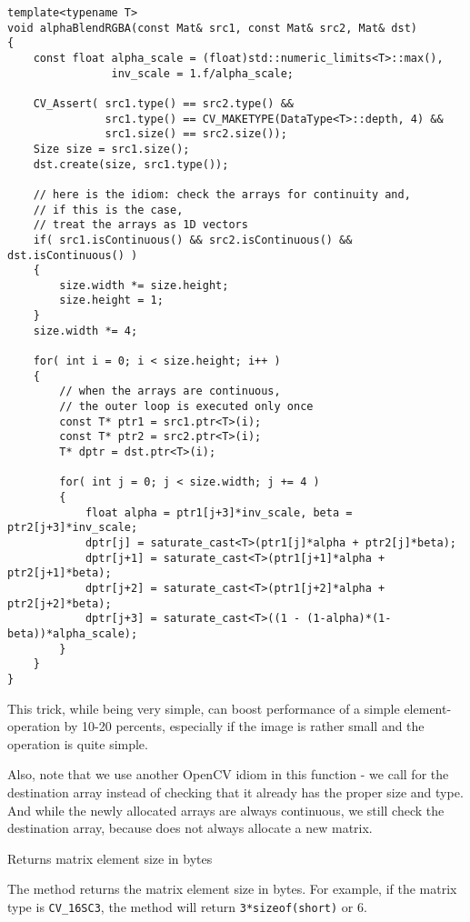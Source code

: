 \begin{lstlisting}
template<typename T>
void alphaBlendRGBA(const Mat& src1, const Mat& src2, Mat& dst)
{
    const float alpha_scale = (float)std::numeric_limits<T>::max(),
                inv_scale = 1.f/alpha_scale;
    
    CV_Assert( src1.type() == src2.type() &&
               src1.type() == CV_MAKETYPE(DataType<T>::depth, 4) &&
               src1.size() == src2.size());
    Size size = src1.size();
    dst.create(size, src1.type());
    
    // here is the idiom: check the arrays for continuity and,
    // if this is the case,
    // treat the arrays as 1D vectors
    if( src1.isContinuous() && src2.isContinuous() && dst.isContinuous() )
    {
        size.width *= size.height;
        size.height = 1;
    }
    size.width *= 4;
    
    for( int i = 0; i < size.height; i++ )
    {
        // when the arrays are continuous,
        // the outer loop is executed only once
        const T* ptr1 = src1.ptr<T>(i);
        const T* ptr2 = src2.ptr<T>(i);
        T* dptr = dst.ptr<T>(i);
        
        for( int j = 0; j < size.width; j += 4 )
        {
            float alpha = ptr1[j+3]*inv_scale, beta = ptr2[j+3]*inv_scale;
            dptr[j] = saturate_cast<T>(ptr1[j]*alpha + ptr2[j]*beta);
            dptr[j+1] = saturate_cast<T>(ptr1[j+1]*alpha + ptr2[j+1]*beta);
            dptr[j+2] = saturate_cast<T>(ptr1[j+2]*alpha + ptr2[j+2]*beta);
            dptr[j+3] = saturate_cast<T>((1 - (1-alpha)*(1-beta))*alpha_scale);
        }
    }
}
\end{lstlisting}

This trick, while being very simple, can boost performance of a simple element-operation by 10-20 percents, especially if the image is rather small and the operation is quite simple.

Also, note that we use another OpenCV idiom in this function - we call  for the destination array instead of checking that it already has the proper size and type. And while the newly allocated arrays are always continuous, we still check the destination array, because  does not always allocate a new matrix.

Returns matrix element size in bytes


The method returns the matrix element size in bytes. For example, if the matrix type is \texttt{CV\_16SC3}, the method will return \texttt{3*sizeof(short)} or 6.

